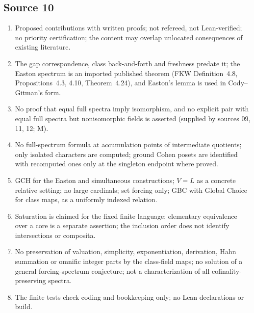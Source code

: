 \documentclass[11pt,letterpaper]{article}
\numberwithin{equation}{section}
\theoremstyle{definition}
\theoremstyle{remark}
\begin{document}
\subsection*{Source 10}
\begin{enumerate}[label=10.\arabic*,leftmargin=3.2em]
\item Proposed contributions with written proofs; not refereed, not Lean-verified; no priority
certification; the content may overlap unlocated consequences of existing literature.
\item The gap correspondence, class back-and-forth and freshness predate it; the Easton spectrum is
an imported published theorem (FKW Definition~4.8, Propositions~4.3, 4.10, Theorem~4.24), and
Easton's lemma is used in Cody--Gitman's form.
\item No proof that equal full spectra imply isomorphism, and no explicit pair with equal full spectra
but nonisomorphic fields is asserted (supplied by sources 09, 11, 12; M).
\item No full-spectrum formula at accumulation points of intermediate quotients; only isolated
characters are computed; ground Cohen posets are identified with recomputed ones only at the singleton
endpoint where proved.
\item GCH for the Easton and simultaneous constructions; $V=L$ as a concrete relative setting; no large
cardinals; set forcing only; GBC with Global Choice for class maps, as a uniformly indexed relation.
\item Saturation is claimed for the fixed finite language; elementary equivalence over a core is a
separate assertion; the inclusion order does not identify intersections or composita.
\item No preservation of valuation, simplicity, exponentiation, derivation, Hahn summation or omnific
integer parts by the class-field maps; no solution of a general forcing-spectrum conjecture; not a
characterization of all cofinality-preserving spectra.
\item The finite tests check coding and bookkeeping only; no Lean declarations or build.
\end{enumerate}
\end{document}
